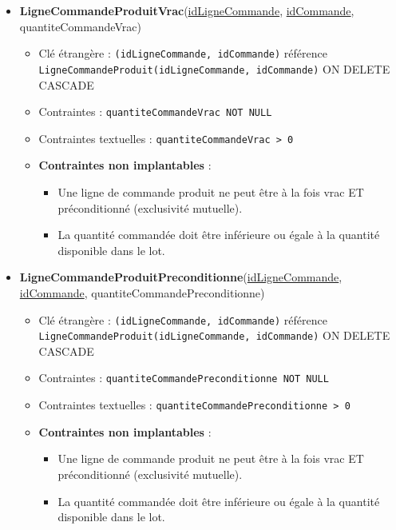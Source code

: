 \begin{itemize}
    \item \textbf{LigneCommandeProduitVrac}(\underline{idLigneCommande}, \underline{idCommande}, quantiteCommandeVrac)
    \begin{itemize}
        \item Clé étrangère : \texttt{(idLigneCommande, idCommande)} référence \texttt{LigneCommandeProduit(idLigneCommande, idCommande)} ON DELETE CASCADE
        \item Contraintes : \texttt{quantiteCommandeVrac NOT NULL}
        \item Contraintes textuelles : \texttt{quantiteCommandeVrac > 0}
        \item \textbf{Contraintes non implantables} :
        \begin{itemize}
            \item Une ligne de commande produit ne peut être à la fois vrac ET préconditionné (exclusivité mutuelle).
            \item La quantité commandée doit être inférieure ou égale à la quantité disponible dans le lot.
        \end{itemize}
    \end{itemize}
    
    \item \textbf{LigneCommandeProduitPreconditionne}(\underline{idLigneCommande}, \underline{idCommande}, quantiteCommandePreconditionne)
    \begin{itemize}
        \item Clé étrangère : \texttt{(idLigneCommande, idCommande)} référence \texttt{LigneCommandeProduit(idLigneCommande, idCommande)} ON DELETE CASCADE
        \item Contraintes : \texttt{quantiteCommandePreconditionne NOT NULL}
        \item Contraintes textuelles : \texttt{quantiteCommandePreconditionne > 0}
        \item \textbf{Contraintes non implantables} :
        \begin{itemize}
            \item Une ligne de commande produit ne peut être à la fois vrac ET préconditionné (exclusivité mutuelle).
            \item La quantité commandée doit être inférieure ou égale à la quantité disponible dans le lot.
        \end{itemize}
    \end{itemize}
    

\end{itemize}
